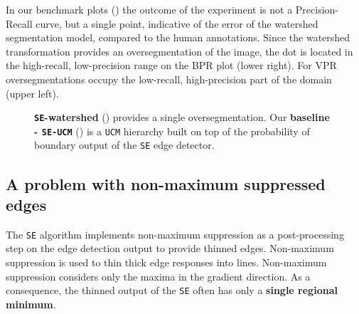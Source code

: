 In our benchmark plots () the outcome of the experiment is not a Precision-Recall curve, but a single point, %
indicative of the error of the watershed segmentation model, compared to the human annotations. Since the watershed transformation provides an oversegmentation of the image, the dot is located in the high-recall, low-precision range on the BPR plot (lower right). For VPR %
oversegmentations occupy the low-recall, high-precision part of the domain (upper left). 

\begin{figure}[t]
\centering
\caption[{\tt SE}-watershed and baseline: {\tt SE-UCM} plots]{\textbf{\texttt{SE}-watershed} () provides a single oversegmentation. Our \textbf{ baseline - \texttt{SE-UCM}} () is a {\tt UCM} hierarchy built on top of the probability of boundary output of the {\tt SE} edge detector.}
\label{fig:SE-watershed}
\end{figure}

\subsection{A problem %
with non-maximum suppressed edges}
\label{sec:ch5-nms-issue}
The {\tt SE} algorithm implements non-maximum suppression as a post-processing step on the edge detection output to provide thinned edges. 
Non-maximum suppression \cite{Rosenfeld1976digital} is used to thin thick edge responses into lines. %
Non-maximum suppression considers only the maxima in the gradient direction. As a consequence, the thinned output of the {\tt SE} often has only a {\bf single regional minimum}. 

